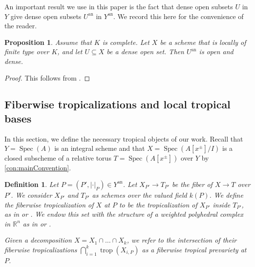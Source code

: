 \documentclass[12pt,reqno,a4paper]{amsart}
\theoremstyle{theoremstyle}
\newtheorem{proposition}[theorem]{Proposition}
\theoremstyle{examplestyle}
\newtheorem{definition}[theorem]{Definition}
\theoremstyle{algorithmstyle}
\newcommand{\RR}{\mathbb{R}}
\newcommand{\an}{{\mathrm{an}}}
\DeclareMathOperator{\Spec}{Spec}
\DeclareMathOperator{\Trop}{trop}
\begin{document}
An important result we use in this paper is the fact that dense open subsets $U$ in $Y$ give dense open subsets $U^{\an}$ in $Y^{\an}$. We record this here for the convenience of the reader.

\begin{proposition}\label{lem:DensityZariski}
  Assume that $K$ is complete. Let $X$ be a scheme that is locally of finite type over $K$, and let $U\subseteq{X}$ be a dense open set. Then $U^{\mathrm{an}}$ is open and dense.
\end{proposition}
\begin{proof}
This follows from \cite[Proposition 2.6.4]{Berkovich1993}.
\end{proof}



\subsection{Fiberwise tropicalizations and local tropical bases}
In this section, we define the necessary tropical objects of our work.  Recall that $Y=\Spec(A)$ is an integral scheme and that $X=\Spec(A[x^\pm]/I)$ is a closed subscheme of a relative torus $T=\Spec(A[x^\pm])$ over $Y$ by \cref{con:mainConvention}. %


\begin{definition}
  \label{def:fiberwiseTropicalization}
  Let $P=(P',|\cdot|_{P})\in Y^\an$. Let $X_{P'}\to T_{P'}$ be the fiber of $X\to T$ over $P'$. We consider $X_{P'}$ and $T_{P'}$ as schemes over the valued field $k(P)$. %
  We define the 
  \emph{fiberwise tropicalization} of $X$ at $P$ to be the tropicalization of $X_{P'}$ inside $T_{P'}$, %
  as in \cite[Section 3]{Gubler2013} or \cite[Definition 3.2.1]{MS15}. %
  We endow this set with the structure of a weighted polyhedral complex in 
  $\RR^n$ as in \cite[Definition 13.4]{Gubler2013} or \cite[Definition 3.4.3]{MS15}.  %

  Given a decomposition $X=X_1\cap\dots\cap X_k$, we refer to the intersection of their fiberwise tropicalizations $\bigcap_{i=1}^k \Trop(X_{i,P})$ as a \emph{fiberwise tropical prevariety} at $P$.
\end{definition}
\end{document}
